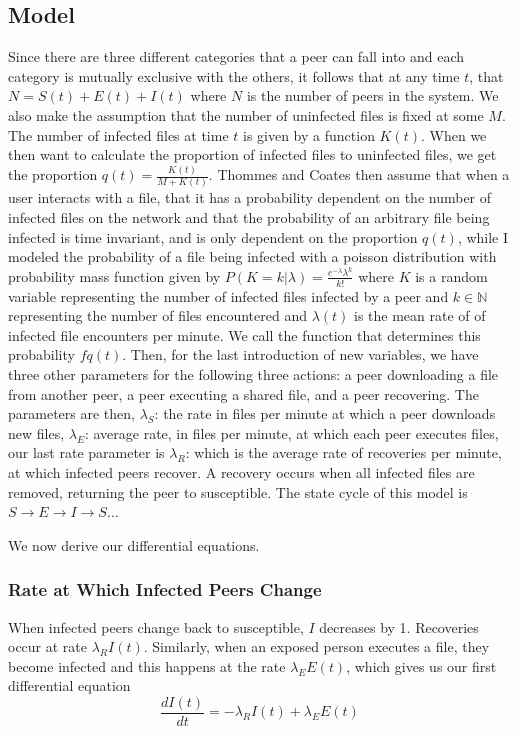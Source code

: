 \documentclass[12pt, oneside]{article}
\begin{document}
    \subsection{Model}
        Since there are three different categories that a peer can fall into and each category is mutually exclusive with the others,
        it follows that at any time $t$, that  $N=S(t)+E(t)+I(t)$ where  $N$ is the number of peers in the system. We also make the assumption that the number of uninfected files is fixed at some $M$.
        The number of infected files at time  $t$ is given by a function  $K(t)$. When we then want to calculate the proportion of infected
        files to uninfected files, we get the proportion  $q(t)=\frac{K(t)}{M+K(t)}$. Thommes and Coates then assume that when a user interacts with a file,
        that it has a probability dependent on the number of infected files on the network and that the probability of an arbitrary file being infected is 
        time invariant, and is only dependent on the proportion $q(t)$, while I modeled the probability of a file being infected with a poisson distribution with
        probability mass function given by $P(K=k | \lambda) = \frac{e^{-\lambda}\lambda^k}{k!}$ where $K$ is a random variable representing the number of infected files
        infected by a peer and $k\in\mathbb{N}$ representing the number of files encountered and $\lambda(t)$ is the mean rate of of infected file encounters per minute.
        We call the function that determines this probability  $f{q(t)}$. Then, for the last introduction of new variables, we have three
        other parameters for the following three actions: a peer downloading a file from another peer, a peer executing a shared file, 
        and a peer recovering. The parameters are then,  $\lambda_S$:  the rate in files per minute at which a peer downloads new files, 
        $\lambda_E$: average rate, in files per minute, at which each peer executes files, our last rate parameter is  $\lambda_R$:
        which is the average rate of recoveries per minute, at which infected peers recover. A recovery occurs when all infected files are
        removed, returning the peer to susceptible. The state cycle of this model is  $S\to E\to I \to S\ldots$\newline

        We now derive our differential equations.
        \subsubsection{Rate at Which Infected Peers Change}
        When infected peers change back to susceptible,  $I$ decreases by 1. Recoveries occur at rate  $\lambda_R I(t)$.
        Similarly, when an exposed person executes a file, they become infected and this happens at the rate $\lambda_E E(t)$, which
        gives us our first differential equation \[
        \frac{dI(t)}{dt}=-\lambda_R I(t)+\lambda_E E(t)
        \] 
\end{document}
